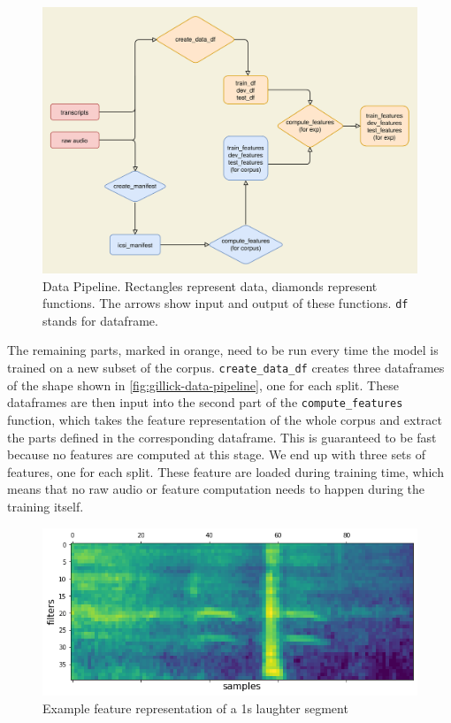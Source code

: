 \documentclass[bsc,frontabs,parskip,deptreport]{infthesis}
\begin{document}
\begin{figure}[h!]
    \centering
    \includegraphics[width=15cm]{imgs/diagrams/Pipeline.drawio.png}
    \caption{Data Pipeline. Rectangles represent data, diamonds represent functions. The arrows show input and output of these functions. \texttt{df} stands for dataframe.}
    \label{fig:data-pipeline}
\end{figure}

The remaining parts, marked in orange, need to be run every time the model is trained on a new subset of the corpus.
\verb|create_data_df| creates three dataframes of the shape shown in \autoref{fig:gillick-data-pipeline}, one for each split.
These dataframes are then input into the second part of the \verb|compute_features| function, which takes the feature representation of the whole corpus and extract the parts defined in the corresponding dataframe. This is guaranteed to be fast because no features are computed at this stage.
We end up with three sets of features, one for each split. 
These feature are loaded during training time, which means that no raw audio or feature computation needs to happen during the training itself.

\begin{figure}[h!]
    \centering
    \includegraphics[width=14cm]{imgs/sample_fbank_feat.png}
    \caption{Example feature representation of a 1s laughter segment}
    \label{fig:feature-sample}
\end{figure}
\end{document}
